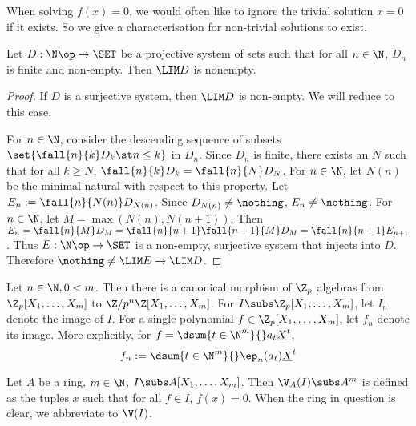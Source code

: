 \begin{rmk}
  When solving $f(x) = 0$, 
  we would often like to ignore the trivial solution $x = 0$ if it exists. 
  So we give a characterisation for non-trivial solutions to exist. 
\end{rmk}

\begin{lem}
  
  Let $D : \N\op \to \SET$ be a projective system of sets 
  such that for all $n\in \N$, $D_n$ is finite and non-empty. 
  Then $\LIM D $ is nonempty. 
\end{lem}
\begin{proof}
  If $D$ is a surjective system, then $\LIM D $ is non-empty. 
  We will reduce to this case. 

  For $n \in \N$, 
  consider the descending sequence of subsets 
  $\set{\fall{n}{k} D_k \st n \leq k}$ in $D_n$. 
  Since $D_n$ is finite, 
  there exists an $N$ such that for all $k \geq N$, 
  $\fall{n}{k} D_k = \fall{n}{N} D_N$.
  For $n \in \N$, 
  let $N(n)$ be the minimal natural with respect to this property. 
  Let $E_n := \fall{n}{N(n)} D_{N(n)}$.
  Since $D_{N(n)} \neq \nothing$, $E_n \neq \nothing$. 
  For $n \in \N$, 
  let $M = \max(N(n),N(n+1))$. 
  Then $E_n = \fall{n}{M} D_M = \fall{n}{n+1}\fall{n+1}{M} D_M 
  = \fall{n}{n+1} E_{n+1}$. 
  Thus $E : \N\op \to \SET$ is a non-empty, surjective system that
  injects into $D$. 
  Therefore $\nothing \neq \LIM E \to \LIM D$.
\end{proof}

\begin{notation}
  Let $n \in \N, 0 < m$. 
  Then there is a canonical morphism of $\Z_p$ algebras from 
  $\Z_p[X_1,\dots,X_m]$ to $\Z/p^n\Z[X_1,\dots,X_m]$.
  For $I \subs \Z_p[X_1,\dots,X_m]$,
  let $I_n$ denote the image of $I$.
  For a single polynomial $f \in \Z_p[X_1,\dots,X_m]$,
  let $f_n$ denote its image. 
  More explicitly, for $f = \dsum{t \in \N^m}{} a_t \underline{X}^t$,
  \[
    f_n := \dsum{t \in \N^m}{} \ep_n(a_t) \underline{X}^t
  \]
\end{notation}

\begin{dfn}[Vanishing]
  
  Let $A$ be a ring, $m \in \N$, $I \subs A[X_1,\dots,X_m]$. 
  Then $\V_A(I) \subs A^m$ is defined as the tuples $x$ such that 
  for all $f \in I$, $f(x) = 0$. 
  When the ring in question is clear, 
  we abbreviate to $\V(I)$. 
\end{dfn}

